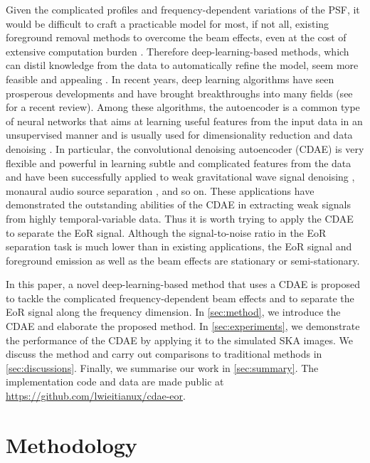 \documentclass[fleqn,usenatbib]{mnras}
\newcommand{\editone}[1]{{\leavevmode\color{cyan}#1}}
\newcommand{\edittwo}[1]{{\leavevmode\color{magenta}#1}}
\begin{document}
Given the complicated profiles and frequency-dependent variations of
the PSF, it would be difficult to craft a practicable model for most,
if not all, existing foreground removal methods to overcome the beam
effects, even at the cost of extensive computation burden
\citep[e.g.,][]{lochner2015}.
Therefore deep-learning-based methods, which can distil knowledge from
the data to automatically refine the model, seem more feasible
and appealing \citep[e.g.,][]{herbel2018,vafaeiSadr2018}.
In recent years, deep learning algorithms have seen prosperous
developments and have brought breakthroughs into many fields
(see \citealt{lecun2015} for a recent review).
\edittwo{%
Among these algorithms, the autoencoder is a common type of neural networks
that aims at learning useful features from the input data in an
unsupervised manner and is usually used for dimensionality reduction
\citep[e.g.,][]{hinton2006,wang2014} and data denoising
\citep[e.g.,][]{xie2012,lu2013,bengio2013}.
In particular,}
the convolutional denoising autoencoder (CDAE) is very flexible and
powerful in learning subtle and complicated features from the data and have
been successfully applied to weak gravitational wave signal denoising
\citep[e.g.,][]{shen2017}, monaural audio source separation
\citep[e.g.,][]{grais2017}, and so on.
These applications have demonstrated the outstanding abilities of the
CDAE in extracting weak signals from highly temporal-variable data.
Thus it is worth trying to apply the CDAE to separate the EoR signal.
Although the signal-to-noise ratio in the EoR separation task is much lower
than in existing applications, the EoR signal and foreground emission as
well as the beam effects are stationary or semi-stationary.

In this paper, a novel deep-learning-based method that uses a CDAE
is proposed to tackle the complicated frequency-dependent beam effects
and to separate the EoR signal along the frequency dimension.
In \autoref{sec:method}, we introduce the CDAE and elaborate
the proposed method.
In \autoref{sec:experiments}, we demonstrate the performance of the
CDAE by applying it to the simulated SKA images.
We discuss the method and carry out
\editone{comparisons to traditional methods}
in \autoref{sec:discussions}.
Finally, we summarise our work in \autoref{sec:summary}.
The implementation code and data are made public at
\url{https://github.com/lwieitianux/cdae-eor}.


\section{Methodology}
\label{sec:method}
\end{document}
